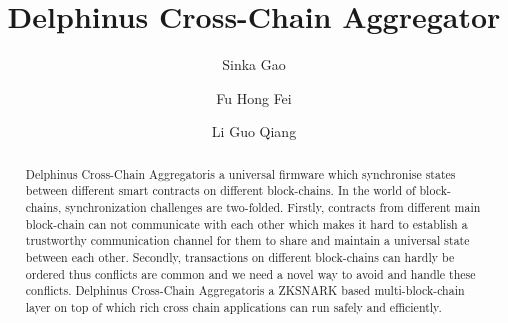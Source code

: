 \documentclass[acmtog, natbib=false]{acmart}
\begin{document}
\title{Delphinus Cross-Chain Aggregator}
\newcommand{\dprotocol}{Delphinus Cross-Chain Aggregator}

\author{Sinka Gao}
\author{Fu Hong Fei}
\author {Li Guo Qiang}

\begin{abstract}
\dprotocol is a universal firmware which synchronise states between different smart contracts on different block-chains. In the world of block-chains, synchronization challenges are two-folded. Firstly, contracts from different main block-chain can not communicate with each other which makes it hard to establish a trustworthy communication channel for them to share and maintain a universal state between each other. Secondly, transactions on different block-chains can hardly be ordered thus conflicts are common and we need a novel way to avoid and handle these conflicts. \dprotocol is a ZKSNARK based multi-block-chain layer on top of which rich cross chain applications can run safely and efficiently.
\end{abstract}





\maketitle
\end{document}
